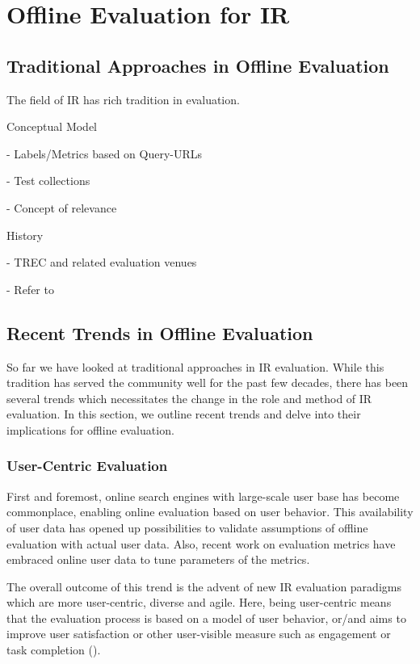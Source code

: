 \documentclass[openany]{now} %
\newcommand{\newpar}{\bigskip\noindent}
\newcommand{\authornote}[3]{\marginpar{\tiny\color{#1}#2: #3}{\color{#1}{$\star$}}}
\newcommand{\emine}[1]{\authornote{green}{Emine}{#1}}
\begin{document}
\section{Offline Evaluation for IR}

\subsection{Traditional Approaches in Offline Evaluation}

The field of IR has rich tradition in evaluation. %

Conceptual Model

- Labels/Metrics based on Query-URLs

- Test collections 

- Concept of relevance 

\newpar
History

- TREC and related evaluation venues \cite{INR-009}

- Refer to \cite{borlund2003} \cite{cleverdon67} \cite{voor:trec05}

\subsection{Recent Trends in Offline Evaluation}

So far we have looked at traditional approaches in IR evaluation. While this tradition has served the community well for the past few decades, there has been several trends which necessitates the change in the role and method of IR evaluation. In this section, we outline recent trends and delve into their implications for offline evaluation.\emine{``recent''}

\subsubsection{User-Centric Evaluation}
First and foremost, online search engines with large-scale user base has become commonplace, enabling online evaluation based on user behavior. This availability of user data has opened up possibilities to validate assumptions of offline evaluation with actual user data. Also, recent work on evaluation metrics \cite{} \cite{} have embraced online user data to tune parameters of the metrics.

The overall outcome of this trend is the advent of new IR evaluation paradigms which are more user-centric, diverse and agile. Here, being user-centric means that the evaluation process is based on a model of user behavior, or/and aims to improve user satisfaction or other user-visible measure such as engagement or task completion (\cite{scholer13}). 
\end{document}
